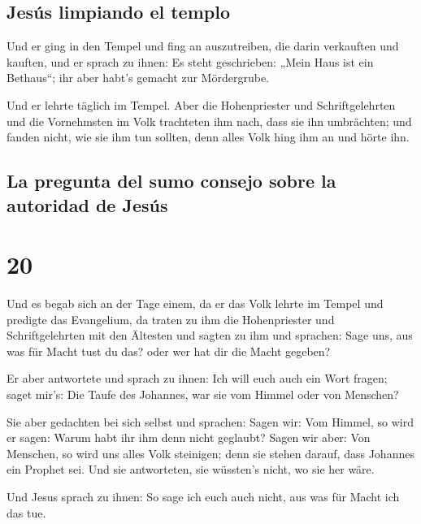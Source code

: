 \hypertarget{jesuxfas-limpiando-el-templo}{%
\subsection{Jesús limpiando el
templo}\label{jesuxfas-limpiando-el-templo}}

 Und er ging in den Tempel und fing an auszutreiben, die
darin verkauften und kauften,  und er sprach zu ihnen: Es
steht geschrieben: „Mein Haus ist ein Bethaus``; ihr aber habt's gemacht
zur Mördergrube.

 Und er lehrte täglich im Tempel. Aber die Hohenpriester
und Schriftgelehrten und die Vornehmsten im Volk trachteten ihm nach,
dass sie ihn umbrächten;  und fanden nicht, wie sie ihm
tun sollten, denn alles Volk hing ihm an und hörte ihn.

\hypertarget{la-pregunta-del-sumo-consejo-sobre-la-autoridad-de-jesuxfas}{%
\subsection{La pregunta del sumo consejo sobre la autoridad de
Jesús}\label{la-pregunta-del-sumo-consejo-sobre-la-autoridad-de-jesuxfas}}

\hypertarget{section-19}{%
\section{20}\label{section-19}}

 Und es begab sich an der Tage einem, da er das Volk
lehrte im Tempel und predigte das Evangelium, da traten zu ihm die
Hohenpriester und Schriftgelehrten mit den Ältesten  und
sagten zu ihm und sprachen: Sage uns, aus was für Macht tust du das?
oder wer hat dir die Macht gegeben?

 Er aber antwortete und sprach zu ihnen: Ich will euch
auch ein Wort fragen; saget mir's:  Die Taufe des
Johannes, war sie vom Himmel oder von Menschen?

 Sie aber gedachten bei sich selbst und sprachen: Sagen
wir: Vom Himmel, so wird er sagen: Warum habt ihr ihm denn nicht
geglaubt?  Sagen wir aber: Von Menschen, so wird uns alles
Volk steinigen; denn sie stehen darauf, dass Johannes ein Prophet sei.
 Und sie antworteten, sie wüssten's nicht, wo sie her
wäre.

 Und Jesus sprach zu ihnen: So sage ich euch auch nicht,
aus was für Macht ich das tue.

